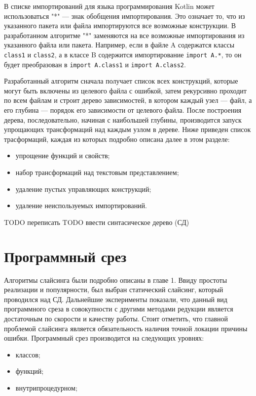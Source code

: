 В списке импортирований для языка программирования Kotlin может использоваться "*" --- знак обобщения импортирования. Это означает то, что из указанного пакета или файла импортируются все возможные конструкции. В разработанном алгоритме "*" заменяются на все возможные импортирования из указанного файла или пакета. Например, если в файле A содержатся классы \texttt{class1} и \texttt{class2}, а в классе B содержится импортирование \texttt{import A.*}, то он будет преобразован в \texttt{import A.class1} и \texttt{import A.class2}. 


Разработанный алгоритм сначала получает список всех конструкций, которые могут быть включены из целевого файла с ошибкой, затем рекурсивно проходит по всем файлам и строит дерево зависимостей, в котором каждый узел --- файл, а его глубина --- порядок его зависимости от целевого файла. После построения дерева, последовательно, начиная с наибольшей глубины, производится запуск упрощающих трансформаций над каждым узлом в дереве. Ниже приведен список трасформаций, каждая из которых подробно описана далее в этом разделе:
\begin{itemize}
	\item упрощение функций и свойств;
	\item набор трансформаций над текстовым представлением;
	\item удаление пустых управляющих конструкций;
	\item удаление неиспользуемых импортирований.
\end{itemize}

TODO переписать
TODO ввести синтасическое дерево (СД)
\section{Программный срез}
Алгоритмы слайсинга были подробно описаны в главе 1. Ввиду простоты реализации и популярности, был выбран статический слайсинг, который проводился над СД. Дальнейшие эксперименты показали, что данный вид программного среза в совокупности с другими методами редукции является достаточным по скорости и качеству работы. Стоит отметить, что главной проблемой слайсинга является обязательность наличия точной локации причины ошибки.
Программный срез производится на следующих уровнях:
\begin{itemize}
	\item классов;
	\item функций;
	\item внутрипроцедурном;
\end{itemize}
